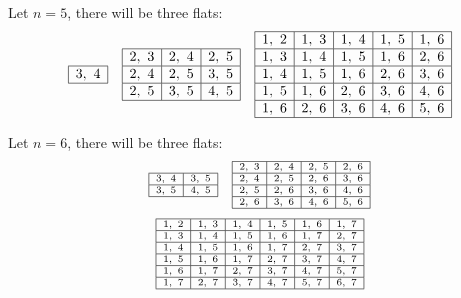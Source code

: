 \documentclass[11pt]{article}
\newcommand{\sourcepage}[1]{\marginpar{\scriptsize p.~#1}}
\begin{document}
\sourcepage{90}
Let $n=5$, there will be three flats:
\[
\begin{array}{ccc}
\begin{array}{|c|}\hline 3,\ 4\\ \hline\end{array}
&
\begin{array}{|c|c|c|}\hline
2,\ 3&2,\ 4&2,\ 5\\ \hline
2,\ 4&2,\ 5&3,\ 5\\ \hline
2,\ 5&3,\ 5&4,\ 5\\ \hline
\end{array}
&
\begin{array}{|c|c|c|c|c|}\hline
1,\ 2&1,\ 3&1,\ 4&1,\ 5&1,\ 6\\ \hline
1,\ 3&1,\ 4&1,\ 5&1,\ 6&2,\ 6\\ \hline
1,\ 4&1,\ 5&1,\ 6&2,\ 6&3,\ 6\\ \hline
1,\ 5&1,\ 6&2,\ 6&3,\ 6&4,\ 6\\ \hline
1,\ 6&2,\ 6&3,\ 6&4,\ 6&5,\ 6\\ \hline
\end{array}
\end{array}
\]

Let $n=6$, there will be three flats:
\[
\scriptsize
\begin{array}{cc}
\begin{array}{|c|c|}\hline
3,\ 4&3,\ 5\\ \hline
3,\ 5&4,\ 5\\ \hline
\end{array}
&
\begin{array}{|c|c|c|c|}\hline
2,\ 3&2,\ 4&2,\ 5&2,\ 6\\ \hline
2,\ 4&2,\ 5&2,\ 6&3,\ 6\\ \hline
2,\ 5&2,\ 6&3,\ 6&4,\ 6\\ \hline
2,\ 6&3,\ 6&4,\ 6&5,\ 6\\ \hline
\end{array}
\end{array}
\]
\[
\scriptsize
\begin{array}{|c|c|c|c|c|c|}\hline
1,\ 2&1,\ 3&1,\ 4&1,\ 5&1,\ 6&1,\ 7\\ \hline
1,\ 3&1,\ 4&1,\ 5&1,\ 6&1,\ 7&2,\ 7\\ \hline
1,\ 4&1,\ 5&1,\ 6&1,\ 7&2,\ 7&3,\ 7\\ \hline
1,\ 5&1,\ 6&1,\ 7&2,\ 7&3,\ 7&4,\ 7\\ \hline
1,\ 6&1,\ 7&2,\ 7&3,\ 7&4,\ 7&5,\ 7\\ \hline
1,\ 7&2,\ 7&3,\ 7&4,\ 7&5,\ 7&6,\ 7\\ \hline
\end{array}
\]
\end{document}
